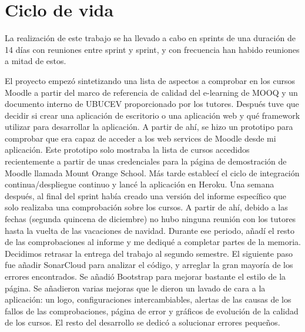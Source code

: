 \section{Ciclo de vida}
La realización de este trabajo se ha llevado a cabo en sprints de una duración de 14 días con reuniones entre sprint y sprint, y con frecuencia han habido reuniones a mitad de estos.

El proyecto empezó sintetizando una lista de aspectos a comprobar en los cursos Moodle a partir del marco de referencia de calidad del e-learning de MOOQ \cite{stracke2018quality} y un documento interno de UBUCEV proporcionado por los tutores.
Después tuve que decidir si crear una aplicación de escritorio o una aplicación web y qué framework utilizar para desarrollar la aplicación.
A partir de ahí, se hizo un prototipo para comprobar que era capaz de acceder a los web services de Moodle desde mi aplicación. Este prototipo solo mostraba la lista de cursos accedidos recientemente a partir de unas credenciales para la página de demostración de Moodle llamada Mount Orange School. Más tarde establecí el ciclo de integración continua/despliegue continuo y lancé la aplicación en Heroku. Una semana después, al final del sprint había creado una versión del informe específico que solo realizaba una comprobación sobre los cursos. A partir de ahí, debido a las fechas (segunda quincena de diciembre) no hubo ninguna reunión con los tutores hasta la vuelta de las vacaciones de navidad. Durante ese periodo, añadí el resto de las comprobaciones al informe y me dediqué a completar partes de la memoria. Decidimos retrasar la entrega del trabajo al segundo semestre. El siguiente paso fue añadir SonarCloud para analizar el código, y arreglar la gran mayoría de los errores encontrados. Se añadió Bootstrap para mejorar bastante el estilo de la página. Se añadieron varias mejoras que le dieron un lavado de cara a la aplicación: un logo, configuraciones intercambiables, alertas de las causas de los fallos de las comprobaciones, página de error y gráficos de evolución de la calidad de los cursos. El resto del desarrollo se dedicó a solucionar errores pequeños.

